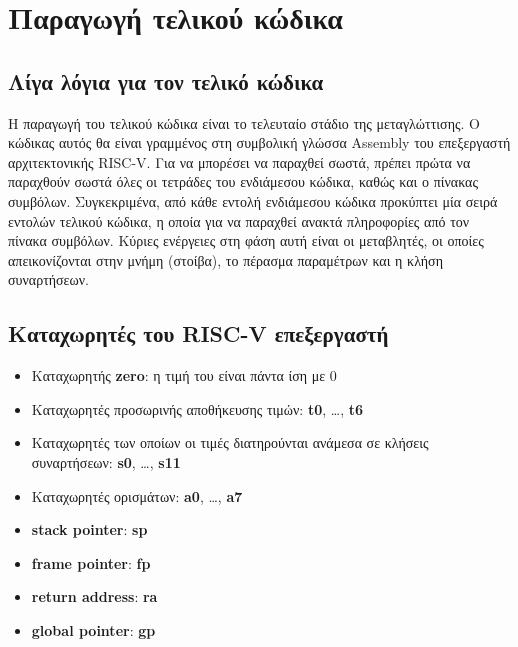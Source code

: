 \documentclass[12pt,a4paper]{article}
\begin{document}

    \section{Παραγωγή τελικού κώδικα}

\subsection{Λίγα λόγια για τον τελικό κώδικα}
Η παραγωγή του τελικού κώδικα είναι το τελευταίο στάδιο της μεταγλώττισης. Ο κώδικας αυτός θα είναι γραμμένος στη συμβολική γλώσσα Assembly του επεξεργαστή αρχιτεκτονικής RISC-V. Για να μπορέσει να παραχθεί σωστά, πρέπει πρώτα να παραχθούν σωστά όλες οι τετράδες του ενδιάμεσου κώδικα, καθώς και ο πίνακας συμβόλων. Συγκεκριμένα, από κάθε εντολή ενδιάμεσου κώδικα προκύπτει μία σειρά εντολών τελικού κώδικα, η οποία για να παραχθεί ανακτά πληροφορίες από τον πίνακα συμβόλων. Κύριες ενέργειες στη φάση αυτή είναι οι μεταβλητές, οι οποίες απεικονίζονται στην μνήμη (στοίβα), το πέρασμα παραμέτρων και η κλήση συναρτήσεων.

\subsection{Καταχωρητές του RISC-V επεξεργαστή}
\begin{itemize}
    \item Καταχωρητής \textbf{zero}: η τιμή του είναι πάντα ίση με 0
    \item Καταχωρητές προσωρινής αποθήκευσης τιμών: \textbf{t0}, \ldots, \textbf{t6}
    \item Καταχωρητές των οποίων οι τιμές διατηρούνται ανάμεσα σε κλήσεις συναρτήσεων: \textbf{s0}, \ldots, \textbf{s11}
    \item Kαταχωρητές ορισμάτων: \textbf{a0}, \ldots, \textbf{a7}
    \item \textbf{stack pointer}: \textbf{sp}
    \item \textbf{frame pointer}: \textbf{fp}
    \item \textbf{return address}: \textbf{ra}
    \item \textbf{global pointer}: \textbf{gp}
\end{itemize}
\end{document}
